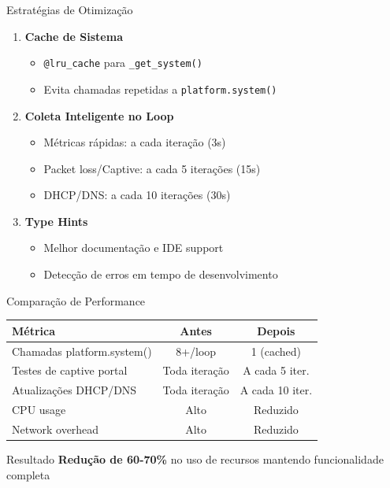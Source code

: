 \documentclass[aspectratio=169]{beamer}
\begin{document}
\begin{frame}{Estratégias de Otimização}
\begin{enumerate}
    \item \textbf{Cache de Sistema}
    \begin{itemize}
        \item \texttt{@lru\_cache} para \texttt{\_get\_system()}
        \item Evita chamadas repetidas a \texttt{platform.system()}
    \end{itemize}
    
    \vspace{0.3cm}
    
    \item \textbf{Coleta Inteligente no Loop}
    \begin{itemize}
        \item Métricas rápidas: a cada iteração (3s)
        \item Packet loss/Captive: a cada 5 iterações (15s)
        \item DHCP/DNS: a cada 10 iterações (30s)
    \end{itemize}
    
    \vspace{0.3cm}
    
    \item \textbf{Type Hints}
    \begin{itemize}
        \item Melhor documentação e IDE support
        \item Detecção de erros em tempo de desenvolvimento
    \end{itemize}
\end{enumerate}
\end{frame}

\begin{frame}{Comparação de Performance}
\begin{table}[]
\centering
\begin{tabular}{|l|c|c|}
\hline
\textbf{Métrica} & \textbf{Antes} & \textbf{Depois} \\ \hline
Chamadas platform.system() & 8+/loop & 1 (cached) \\ \hline
Testes de captive portal & Toda iteração & A cada 5 iter. \\ \hline
Atualizações DHCP/DNS & Toda iteração & A cada 10 iter. \\ \hline
CPU usage & Alto & Reduzido \\ \hline
Network overhead & Alto & Reduzido \\ \hline
\end{tabular}
\end{table}

\vspace{0.5cm}

\begin{exampleblock}{Resultado}
\textbf{Redução de 60-70\%} no uso de recursos mantendo funcionalidade completa
\end{exampleblock}
\end{frame}
\end{document}

